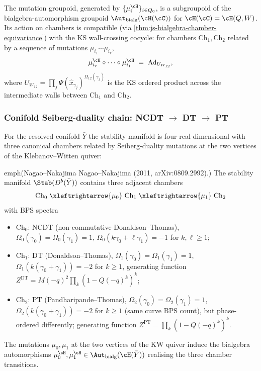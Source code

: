 \begin{corollary}
 \label{cor:mutation-in-aut-bialg}
 The mutation groupoid, generated by $\{\mu_i^\cH\}_{i \in Q_0}$, is a
 subgroupoid of the bialgebra-automorphism groupoid
 $\Aut_{\mathrm{bialg}}(\cH(\cC))$ for $\cH(\cC) = \cH(Q, W)$. Its action
 on chambers is compatible (via
 \cref{thm:js-bialgebra-chamber-equivariance}) with the KS wall-crossing
 cocycle: for chambers $\mathrm{Ch}_1, \mathrm{Ch}_2$ related by a sequence of
 mutations $\mu_{i_1} \cdots \mu_{i_r}$,
 \[
 \mu_{i_r}^\cH \circ \cdots \circ \mu_{i_1}^\cH
 \;=\; \mathrm{Ad}_{U_{W_{12}}},
 \]
 where $U_{W_{12}} = \prod_j \Psi(\hat{x}_{\gamma_j})^{\Omega_{12}(\gamma_j)}$
 is the KS ordered product across the intermediate walls between
 $\mathrm{Ch}_1$ and $\mathrm{Ch}_2$.
\end{corollary}

\subsubsection{Conifold Seiberg-duality chain: NCDT $\to$ DT $\to$ PT}
\label{subsec:conifold-seiberg-chain}

For the resolved conifold $\bar{Y}$ the stability manifold is
four-real-dimensional with three canonical chambers related by
Seiberg-duality mutations at the two vertices of the Klebanov--Witten
quiver:

\begin{theorem}
 \label{thm:conifold-seiberg-chain}
 emph{(Nagao--Nakajima Nagao--Nakajima (2011, arXiv:0809.2992).)}
 The stability manifold $\Stab(D^b(\bar{Y}))$ contains three adjacent
 chambers
 \[
 \mathrm{Ch}_0 \;\xleftrightarrow{\mu_0}\; \mathrm{Ch}_1 \;\xleftrightarrow{\mu_1}\; \mathrm{Ch}_2
 \]
 with BPS spectra
 \begin{itemize}[leftmargin=2em]
 \item $\mathrm{Ch}_0$: NCDT (non-commutative Donaldson--Thomas),
 $\Omega_0(\gamma_0) = \Omega_0(\gamma_1) = 1$,
 $\Omega_0(k\gamma_0 + \ell\gamma_1) = -1$ for $k, \ell \geq 1$;
 \item $\mathrm{Ch}_1$: DT (Donaldson--Thomas),
 $\Omega_1(\gamma_0) = \Omega_1(\gamma_1) = 1$,
 $\Omega_1(k(\gamma_0 + \gamma_1)) = -2$ for $k \geq 1$,
 generating function $Z^{\mathrm{DT}} = M(-q)^2 \prod_k (1 - Q(-q)^k)^k$;
 \item $\mathrm{Ch}_2$: PT (Pandharipande--Thomas),
 $\Omega_2(\gamma_0) = \Omega_2(\gamma_1) = 1$,
 $\Omega_2(k(\gamma_0 + \gamma_1)) = -2$ for $k \geq 1$ (same
 curve BPS count), but phase-ordered differently;
 generating function $Z^{\mathrm{PT}} = \prod_k (1 - Q(-q)^k)^k$.
 \end{itemize}
 The mutations $\mu_0, \mu_1$ at the two vertices of the KW quiver induce
 the bialgebra automorphisms $\mu_0^\cH, \mu_1^\cH \in
 \Aut_{\mathrm{bialg}}(\cH(\bar{Y}))$ realising the three chamber transitions.
\end{theorem}

